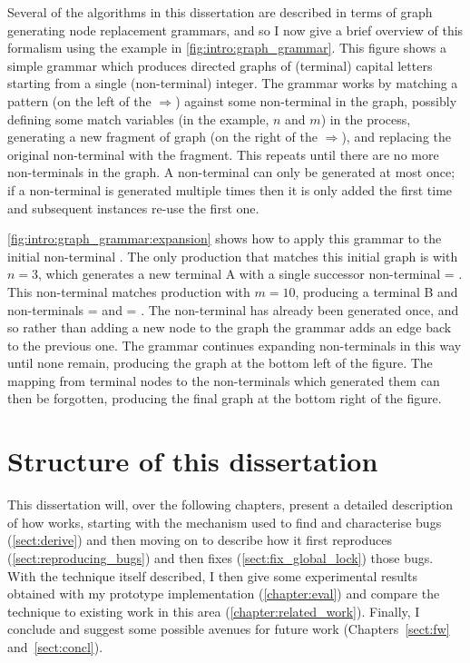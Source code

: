\noindent
Several of the algorithms in this dissertation are described in terms
of graph generating node replacement grammars, and so I now give a
brief overview of this formalism using the example in
\autoref{fig:intro:graph_grammar}.  This figure shows a simple grammar
which produces directed graphs of (terminal) capital letters starting
from a single (non-terminal) integer.  The grammar works by matching a
pattern (on the left of the $\Rightarrow$) against some non-terminal
in the graph, possibly defining some match variables (in the example,
$n$ and $m$) in the process, generating a new fragment of graph (on
the right of the $\Rightarrow$), and replacing the original
non-terminal with the fragment.  This repeats until there are no more
non-terminals in the graph.  A non-terminal can only be generated at
most once; if a non-terminal is generated multiple times then it is
only added the first time and subsequent instances re-use the first
one.

\autoref{fig:intro:graph_grammar:expansion} shows how to apply this
grammar to the initial non-terminal .  The only production
that matches this initial graph is  with $n = 3$, which
generates a new terminal A with a single successor non-terminal
 = .  This non-terminal matches production
 with $m=10$, producing a terminal B and non-terminals
= and  =
.  The  non-terminal has already been generated
once, and so rather than adding a new node to the graph the grammar
adds an edge back to the previous one.  The grammar continues
expanding non-terminals in this way until none remain, producing the
graph at the bottom left of the figure.  The mapping from terminal
nodes to the non-terminals which generated them can then be forgotten,
producing the final graph at the bottom right of the figure.

\section{Structure of this dissertation}

This dissertation will, over the following chapters, present a
detailed description of how {\technique} works, starting with the
mechanism used to find and characterise bugs (\autoref{sect:derive})
and then moving on to describe how it first reproduces
(\autoref{sect:reproducing_bugs}) and then fixes
(\autoref{sect:fix_global_lock}) those bugs.  With the technique
itself described, I then give some experimental results obtained with
my prototype implementation {\implementation} (\autoref{chapter:eval})
and compare the technique to existing work in this area
(\autoref{chapter:related_work}).  Finally, I conclude and suggest
some possible avenues for future work (Chapters~\ref{sect:fw}
and~\ref{sect:concl}).
